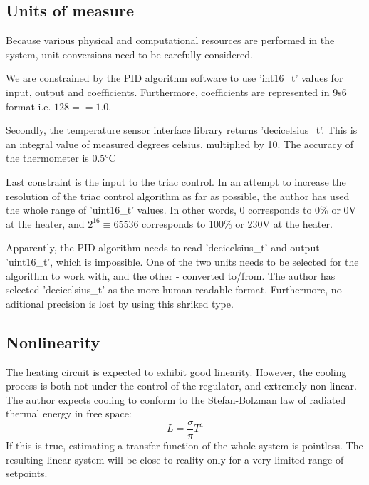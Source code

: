 \subsection{Units of measure}
Because various physical and computational resources are performed in the system, unit conversions need to be carefully considered.
\par
We are constrained by the PID algorithm software to use 'int16\_t' values for input, output and coefficients.
Furthermore, coefficients are represented in 9s6 format i.e. $128 == 1.0$.
\par
Secondly, the temperature sensor interface library returns 'decicelsius\_t'.
This is an integral value of measured degrees celsius, multiplied by 10.
The accuracy of the thermometer is $0.5\si{\celsius}$
\par
Last constraint is the input to the triac control.
In an attempt to increase the resolution of the triac control algorithm as far as possible, the author has used the whole range of 'uint16\_t' values.
In other words, 0 corresponds to 0\% or 0\si{\volt} at the heater, and $2^16 \equiv 65536$ corresponds to 100\% or 230\si{\volt} at the heater.
\par
Apparently, the PID algorithm needs to read 'decicelsius\_t' and output 'uint16\_t', which is impossible.
One of the two units needs to be selected for the algorithm to work with, and the other - converted to/from.
The author has selected 'decicelsius\_t' as the more human-readable format.
Furthermore, no aditional precision is lost by using this shriked type.

\subsection{Nonlinearity}
The heating circuit is expected to exhibit good linearity.
However, the cooling process is both not under the control of the regulator, and extremely non-linear.
The author expects cooling to conform to the Stefan-Bolzman law of radiated thermal energy in free space:
$$ L = \frac{\sigma}{\pi}T^4 $$
If this is true, estimating a transfer function of the whole system is pointless.
The resulting linear system will be close to reality only for a very limited range of setpoints.

